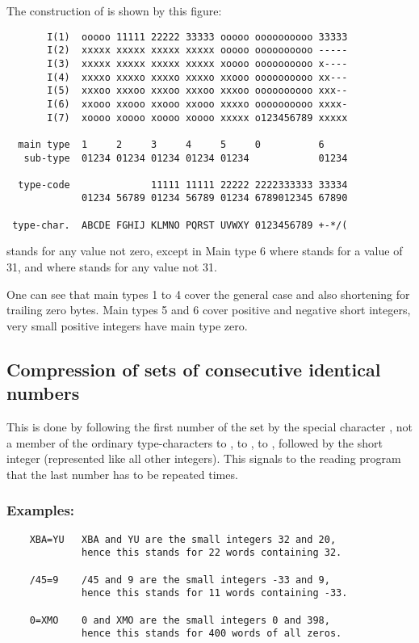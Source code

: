 The construction of  is shown by this figure:

\begin{verbatim}
       I(1)  ooooo 11111 22222 33333 ooooo oooooooooo 33333
       I(2)  xxxxx xxxxx xxxxx xxxxx ooooo oooooooooo -----
       I(3)  xxxxx xxxxx xxxxx xxxxx xoooo oooooooooo x----
       I(4)  xxxxo xxxxo xxxxo xxxxo xxooo oooooooooo xx---
       I(5)  xxxoo xxxoo xxxoo xxxoo xxxoo oooooooooo xxx--
       I(6)  xxooo xxooo xxooo xxooo xxxxo oooooooooo xxxx-
       I(7)  xoooo xoooo xoooo xoooo xxxxx o123456789 xxxxx

  main type  1     2     3     4     5     0          6
   sub-type  01234 01234 01234 01234 01234            01234

  type-code              11111 11111 22222 2222333333 33334
             01234 56789 01234 56789 01234 6789012345 67890

 type-char.  ABCDE FGHIJ KLMNO PQRST UVWXY 0123456789 +-*/(
\end{verbatim}

 stands for any value not zero,
except in Main type 6 where  stands for a value of 31,
and where  stands for any value not 31.

One can see that main types 1 to 4 cover the general case and also
shortening for trailing zero bytes.
Main types 5 and 6 cover positive and negative short integers,
very small positive integers have main type zero.

\subsection*{Compression of sets of consecutive identical numbers}

This is done by following the first number of the set by the
special character , not a member of the ordinary
type-characters  to ,   to ,
\Lit{+} to \Lit{(}, followed by the short integer  
(represented like all other integers).
This signals to the reading program that the last number has to
be repeated  times.

\subsubsection*{Examples:}

\begin{verbatim}
    XBA=YU   XBA and YU are the small integers 32 and 20,
             hence this stands for 22 words containing 32.

    /45=9    /45 and 9 are the small integers -33 and 9,
             hence this stands for 11 words containing -33.

    0=XMO    0 and XMO are the small integers 0 and 398,
             hence this stands for 400 words of all zeros.
\end{verbatim}


